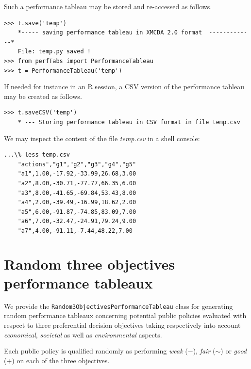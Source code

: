 Such a performance tableau may be stored and re-accessed as follows.

\begin{lstlisting}[basicstyle=\footnotesize]
>>> t.save('temp')
    *----- saving performance tableau in XMCDA 2.0 format  -------------*
    File: temp.py saved !
>>> from perfTabs import PerformanceTableau
>>> t = PerformanceTableau('temp')
\end{lstlisting}

 If needed for instance in an R session, a CSV version of the performance tableau may be created as follows.
\begin{lstlisting}
>>> t.saveCSV('temp')
    * --- Storing performance tableau in CSV format in file temp.csv
\end{lstlisting}

We may inspect the content of the file \emph{temp.csv} in a shell console:
\begin{lstlisting}
...\% less temp.csv
    "actions","g1","g2","g3","g4","g5"
    "a1",1.00,-17.92,-33.99,26.68,3.00
    "a2",8.00,-30.71,-77.77,66.35,6.00
    "a3",8.00,-41.65,-69.84,53.43,8.00
    "a4",2.00,-39.49,-16.99,18.62,2.00
    "a5",6.00,-91.87,-74.85,83.09,7.00
    "a6",7.00,-32.47,-24.91,79.24,9.00
    "a7",4.00,-91.11,-7.44,48.22,7.00
\end{lstlisting}

 \section{Random three objectives performance tableaux}
\label{sec:5.4}

We provide the \texttt{Random3ObjectivesPerformanceTableau} class for generating random performance tableaux concerning potential public policies evaluated with respect to three preferential decision objectives taking respectively into account \emph{economical}, \emph{societal} as well as \emph{environmental} aspects.

Each public policy is qualified randomly as performing \emph{weak} ($-$), \emph{fair} ($\sim$) or \emph{good} ($+$) on each of the three objectives. 

